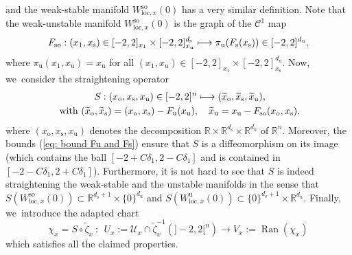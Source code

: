 \documentclass[JEP,XML,SOM,Unicode,NoEqCountersInSection,NoFloatCountersInSection,published]{cedram}
\newcommand\mto{\mathchoice{\longmapsto}{\mapsto}{\mapsto}{\mapsto}}
\newcommand{\loc}{\mathrm{loc}}
\newcommand{\ro}{\mathrm{o}}
\newcommand{\rs}{\mathrm{s}}
\newcommand{\rso}{\mathrm{so}}
\newcommand{\ru}{\mathrm{u}}
\theoremstyle{definition}
\theoremstyle{plain}
\newcommand{\Ccal}{\mathcal{C}}
\newcommand{\R}{\mathbb{R}}
\newcommand{\Ucal}{\mathcal{U}}
\DeclareMathOperator{\Ran}{Ran}
\begin{document}
\begin{appendix}
\[\]
and the weak-stable manifold $ W_{\loc,x}^{\rso} (0)$ has a very similar definition. Note that the weak-unstable manifold $W_{\loc,x}^{\rso} (0)$ is the graph of the $\Ccal^{1}$ map
\[
F_{\rso}: (x_1, x_\rs) \in [-2,2]_{x_1} \times [-2,2]_{x_\ru}^{d_\rs} \mto \pi_\ru (F_\rs (x_\rs)) \in [-2,2]^{d_\ru},
\]
where $\pi_\ru (x_1,x_\ru) = x_\ru$ for all $(x_1,x_\ru) \in [-2,2]_{x_1} \times [-2,2]_{x_\rs}^{d_\ru}$. Now, we~consider the straightening operator
\begin{align*}
& \qquad \qquad S: (x_\ro, x_\rs, x_\ru) \in [-2,2]^{n} \mto (\widetilde{x}_\ro, \widetilde{x}_\rs, \widetilde{x}_\ru), \\
&\text{ with } (\widetilde{x}_\ro, \widetilde{x}_\rs)= (x_\ro, x_\rs) - F_\ru (x_\ru), \quad \widetilde{x}_\ru= x_\ru - F_{\rso} (x_\ro,x_\rs),
\end{align*}
where $(x_\ro, x_\rs,x_\ru)$ denotes the decomposition $\R \times \R^{d_\rs} \times \R^{d_\ru} $ of $\R^n$. Moreover, the bounds (\ref{eq: bound Fu and Fs}) ensure that $S$ is a diffeomorphism on its image (which contains the ball $[-2 + C\delta_1,2 - C\delta_1]$ and is contained in $[-2 - C\delta_1,2 + C\delta_1]$). Furthermore, it is not hard to see that $S$ is indeed straightening the weak-stable and the unstable manifolds in the sense that $ S (W_{\loc,x}^{\rso} (0)) \subset \R^{d_\rs + 1} \times \{0\}^{d_\ru}$ and $ S (W_{\loc,x}^{\ru} (0)) \subset \{0\}^{d_\rs + 1} \times \R^{d_\ru}$. Finally, we~introduce the adapted chart
\[
\chi_x = S \circ \widetilde{\zeta}_x \:: \: \: U_x:= \Ucal_x \cap \widetilde{\zeta}_x^{-1} (]-2,2[^n) \to V_x:= \Ran (\chi_x)
\]
which satisfies all the claimed properties.


\end{appendix}
\end{document}
